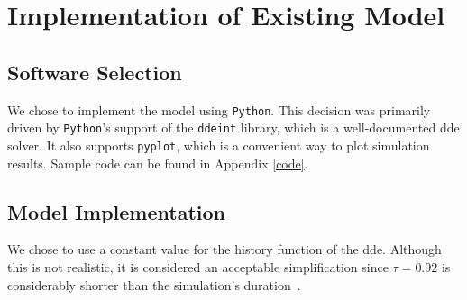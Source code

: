 \chapter{Implementation of Existing Model}

\section{Software Selection}

We chose to implement the model using \texttt{Python}. This decision was primarily driven by \texttt{Python}'s support of the \verb|ddeint| library, which is a well-documented \gls{dde} solver. It also supports \verb|pyplot|, which is a convenient way to plot simulation results. Sample code can be found in Appendix \ref{code}.




\section{Model Implementation}

We chose to use a constant value for the history function of the \gls{dde}. Although this is not realistic, it is considered an acceptable simplification since $\tau =0.92$  is considerably shorter than the simulation's duration~\cite{villasana_heuristic_2004}.


